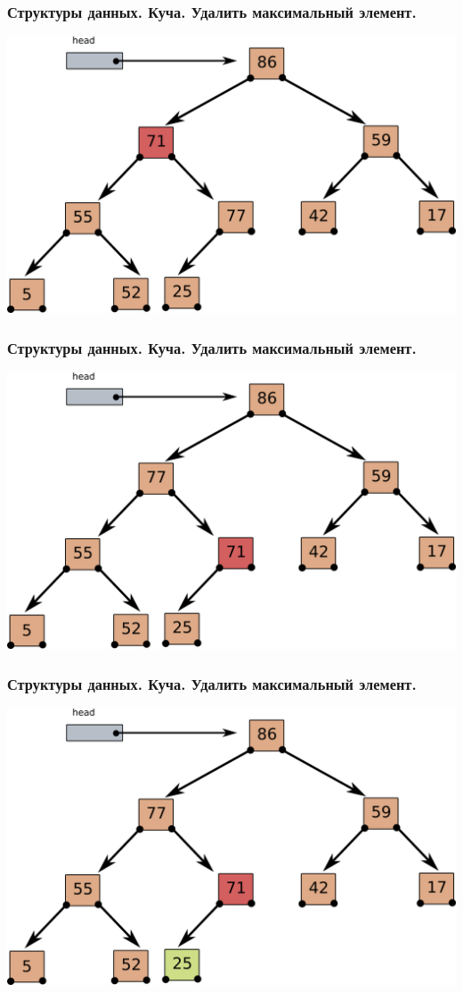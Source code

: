 \documentclass[10pt]{beamer}
\begin{document}
\begin{frame}[fragile]
\frametitle{Структуры данных. Куча. Удалить максимальный элемент.} 
\begin{center}
\includegraphics[width=0.95\linewidth]{images/heap_pop_max_4.png}
\end{center}
\end{frame}
\begin{frame}[fragile]
\frametitle{Структуры данных. Куча. Удалить максимальный элемент.} 
\begin{center}
\includegraphics[width=0.95\linewidth]{images/heap_pop_max_5.png}
\end{center}
\end{frame}
\begin{frame}[fragile]
\frametitle{Структуры данных. Куча. Удалить максимальный элемент.} 
\begin{center}
\includegraphics[width=0.95\linewidth]{images/heap_pop_max_6.png}
\end{center}
\end{frame}
\end{document}
